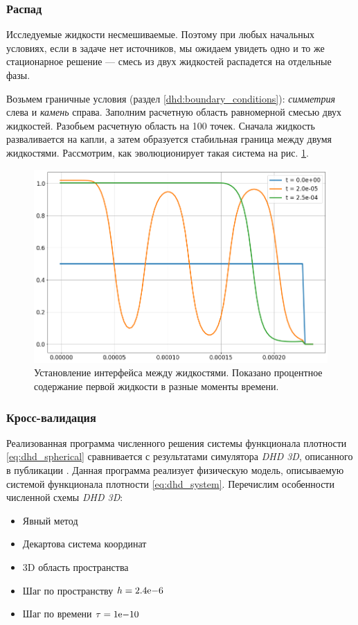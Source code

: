\subsubsection{Распад \label{dhd:interface}}
Исследуемые жидкости несмешиваемые. Поэтому при любых начальных условиях, если в задаче нет источников, мы ожидаем увидеть одно и то же стационарное решение --- смесь из двух жидкостей распадется на отдельные фазы. 
\par
Возьмем граничные условия (раздел \ref{dhd:boundary_conditions}): \textit{симметрия} слева и \textit{камень} справа. Заполним расчетную область равномерной смесью двух жидкостей. Разобьем расчетную область на 100 точек.
Сначала жидкость разваливается на капли, а затем образуется стабильная граница между двумя жидкостями. Рассмотрим, как эволюционирует такая система на рис. \ref{fig:decay}.
\begin{figure}[H]
\centering
\includegraphics[width=.7\textwidth]{dhd_decay/decay.png}
\caption{Установление интерфейса между жидкостями. Показано процентное содержание первой жидкости в разные моменты времени.}
\label{fig:decay}
\end{figure}
\subsubsection{Кросс-валидация}
Реализованная программа численного решения системы функционала плотности \eqref{eq:dhd_spherical} сравнивается с результатами симулятора \textit{DHD 3D}, описанного в публикации \cite{dhd_spe}. Данная программа реализует физическую модель, описываемую системой функционала плотности \eqref{eq:dhd_system}. Перечислим особенности численной схемы \textit{DHD 3D}:
\begin{itemize}
\item Явный метод
\item Декартова система координат
\item 3D область пространства
\item Шаг по пространству $h = {2.4}\mathrm{e}{-6}$
\item Шаг по времени $\tau = {1}\mathrm{e}{-10}$
\end{itemize}
